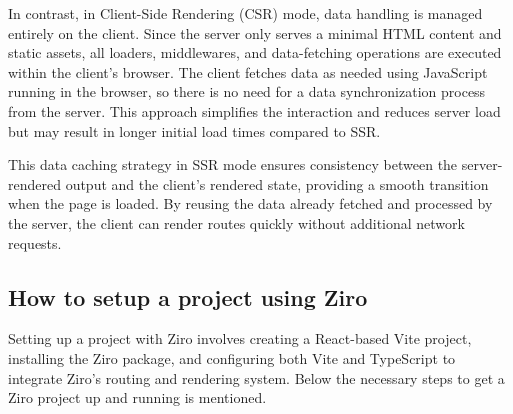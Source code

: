 In contrast, in Client-Side Rendering (CSR) mode, data handling is managed entirely on the client. Since the server only serves a minimal HTML content and static assets, all loaders, middlewares, and data-fetching operations are executed within the client's browser. The client fetches data as needed using JavaScript running in the browser, so there is no need for a data synchronization process from the server. This approach simplifies the interaction and reduces server load but may result in longer initial load times compared to SSR.

This data caching strategy in SSR mode ensures consistency between the server-rendered output and the client's rendered state, providing a smooth transition when the page is loaded. By reusing the data already fetched and processed by the server, the client can render routes quickly without additional network requests.


\subsection{How to setup a project using Ziro}

Setting up a project with Ziro involves creating a React-based Vite project, installing the Ziro package, and configuring both Vite and TypeScript to integrate Ziro's routing and rendering system. Below the necessary steps to get a Ziro project up and running is mentioned.

